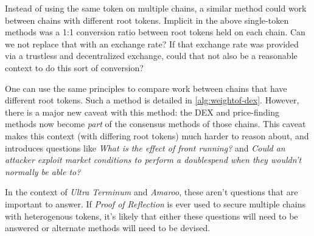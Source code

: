 
Instead of using the same token on multiple chains, a similar method could work between chains with different root tokens.
Implicit in the above single-token methods was a 1:1 conversion ratio between root tokens held on each chain.
Can we not replace that with an exchange rate?
If that exchange rate was provided via a trustless and decentralized exchange, could that not also be a reasonable context to do this sort of conversion?

One can use the same principles to compare work between chains that have different root tokens.
Such a method is detailed in \autoref{alg:weightof-dex}.
However, there is a major new caveat with this method: the DEX and price-finding methods now become \emph{part} of the consensus methods of those chains.
This caveat makes this context (with differing root tokens) much harder to reason about, and introduces questions like \emph{What is the effect of front running?} and \emph{Could an attacker exploit market conditions to perform a doublespend when they wouldn't normally be able to?}

\def\convertingWeightDexNotImportant{%
  In the context of \emph{Ultra Terminum} and \emph{Amaroo}, these aren't questions that are important to answer. If \emph{Proof of Reflection} is ever used to secure multiple chains with heterogenous tokens, it's likely that either these questions will need to be answered or alternate methods will need to be devised.%
}

\convertingWeightDexNotImportant


